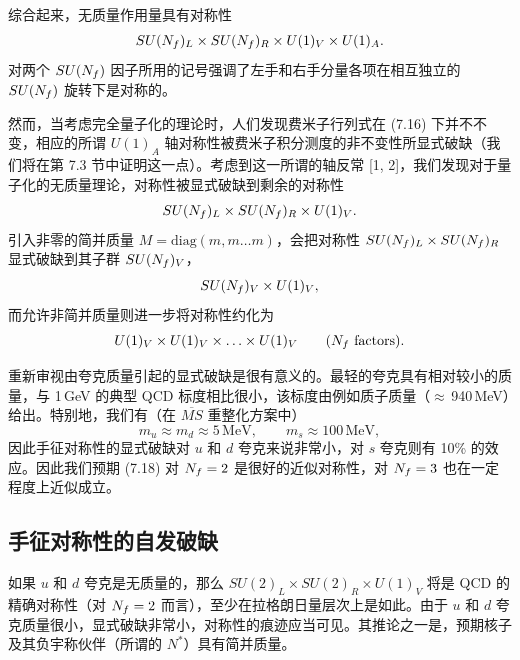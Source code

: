 综合起来，无质量作用量具有对称性
\begin{equation}
  SU(N_f)_L \times SU(N_f)_R \times U(1)_V \times U(1)_A .
\end{equation}
对两个 $SU(N_f)$ 因子所用的记号强调了左手和右手分量各项在相互独立的 $SU(N_f)$ 旋转下是对称的。

然而，当考虑完全量子化的理论时，人们发现费米子行列式在 (7.16) 下并不不变，相应的所谓 $U(1)_A$ 轴对称性被费米子积分测度的非不变性所显式破缺（我们将在第 7.3 节中证明这一点）。考虑到这一所谓的轴反常 [1, 2]，我们发现对于量子化的无质量理论，对称性被显式破缺到剩余的对称性
\begin{equation}
  SU(N_f)_L \times SU(N_f)_R \times U(1)_V .
\end{equation}
引入非零的简并质量 $M = \mathrm{diag}(m, m \ldots m)$，会把对称性 $SU(N_f)_L \times SU(N_f)_R$ 显式破缺到其子群 $SU(N_f)_V$，
\begin{equation}
  SU(N_f)_V \times U(1)_V,
\end{equation}
而允许非简并质量则进一步将对称性约化为
\begin{equation}
  U(1)_V \times U(1)_V \times \ldots \times U(1)_V
  \qquad (N_f \text{ factors}) .
\end{equation}

重新审视由夸克质量引起的显式破缺是很有意义的。最轻的夸克具有相对较小的质量，与 1\,GeV 的典型 QCD 标度相比很小，该标度由例如质子质量（$\approx$\,940\,MeV）给出。特别地，我们有（在 $\overline{MS}$ 重整化方案中）
\begin{equation}
  m_u \approx m_d \approx 5\,\mathrm{MeV}, \qquad m_s \approx 100\,\mathrm{MeV},
\end{equation}
因此手征对称性的显式破缺对 $u$ 和 $d$ 夸克来说非常小，对 $s$ 夸克则有 10\% 的效应。因此我们预期 (7.18) 对 $N_f = 2$ 是很好的近似对称性，对 $N_f = 3$ 也在一定程度上近似成立。

\subsection{手征对称性的自发破缺}

如果 $u$ 和 $d$ 夸克是无质量的，那么 $SU(2)_L \times SU(2)_R \times U(1)_V$ 将是 QCD 的精确对称性（对 $N_f = 2$ 而言），至少在拉格朗日量层次上是如此。由于 $u$ 和 $d$ 夸克质量很小，显式破缺非常小，对称性的痕迹应当可见。其推论之一是，预期核子及其负宇称伙伴（所谓的 $N^*$）具有简并质量。

